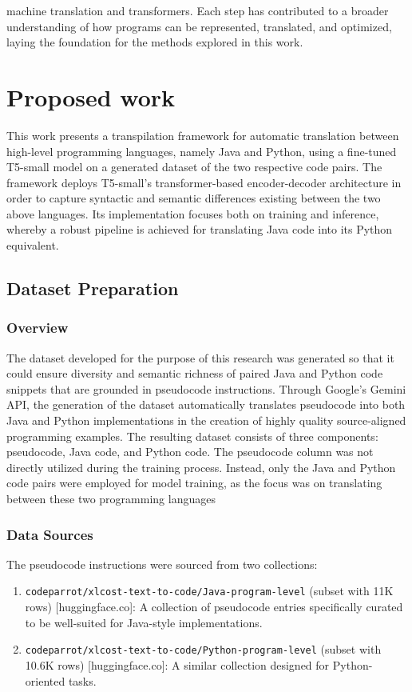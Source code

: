 \documentclass{dhbenelux}
\begin{document}
machine translation and transformers. Each step has contributed to a broader understanding of how programs can be represented, translated, and optimized, laying the foundation for the methods explored in this work.

\section{Proposed work}

This work presents a transpilation framework for automatic translation between high-level programming languages, namely Java and Python, using a fine-tuned T5-small model on a generated dataset of the two respective code pairs. The framework deploys T5-small's transformer-based encoder-decoder architecture in order to capture syntactic and semantic differences existing between the two above languages. Its implementation focuses both on training and inference, whereby a robust pipeline is achieved for translating Java code into its Python equivalent.

\subsection{Dataset Preparation}

\subsubsection{Overview}

The dataset developed for the purpose of this research was generated so that it could ensure diversity and semantic richness of paired Java and Python code snippets that are grounded in pseudocode instructions. Through Google's Gemini API, the generation of the dataset automatically translates pseudocode into both Java and Python implementations in the creation of highly quality source-aligned programming examples. The resulting dataset consists of three components: pseudocode, Java code, and Python code. The pseudocode column was not directly utilized during the training process. Instead, only the Java and Python code pairs were employed for model training, as the focus was on translating between these two programming languages

\subsubsection{Data Sources}

The pseudocode instructions were sourced from two collections:
\begin{enumerate}
  \item \texttt{codeparrot/xlcost-text-to-code/Java-program-level} (subset with 11K rows) [huggingface.co]: A collection of pseudocode entries specifically curated to be well-suited for Java-style implementations.
  \item \texttt{codeparrot/xlcost-text-to-code/Python-program-level} (subset with 10.6K rows) [huggingface.co]: A similar collection designed for Python-oriented tasks.
\end{enumerate}
\end{document}
